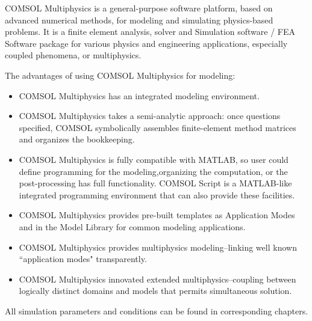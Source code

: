 COMSOL Multiphysics is a general-purpose software platform, based on advanced numerical methods, for modeling and simulating physics-based problems. It is a finite element analysis, solver and Simulation software / FEA Software package for various physics and engineering applications, especially coupled phenomena, or multiphysics.

The advantages of using COMSOL Multiphysics for modeling:
\begin{itemize}
	\item COMSOL Multiphysics has an integrated modeling environment.
	\item COMSOL Multiphysics takes a semi-analytic approach: once questions specified, COMSOL symbolically assembles finite-element method matrices and organizes the bookkeeping.
	\item COMSOL Multiphysics is fully compatible with MATLAB, so user could define programming for the modeling,organizing the computation, or the post-processing has full functionality. COMSOL Script is a MATLAB-like integrated programming environment that can also provide these facilities.
	\item COMSOL Multiphysics provides pre-built templates as Application Modes and in the Model Library for common modeling applications.
	\item COMSOL Multiphysics provides multiphysics modeling--linking well known ``application modes" transparently.
	\item COMSOL Multiphysics innovated extended multiphysics--coupling between logically distinct domains and models that permits simultaneous solution.
\end{itemize}

All simulation parameters and conditions can be found in corresponding chapters.